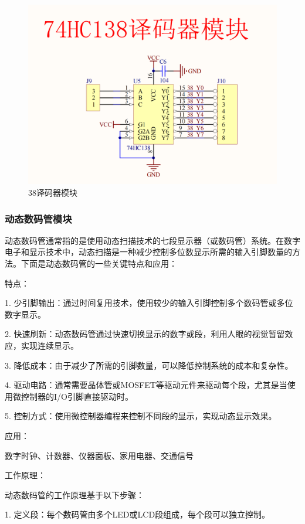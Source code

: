 \documentclass{textreportclass}  %
\begin{document}
	
	\begin{figure}[htbp]
		\centering
		\includegraphics[scale=0.3]{Fig/38译码器模块.png}
		\caption{38译码器模块}\label{Fig.17}
	\end{figure}
	
	\subsubsection{动态数码管模块}					%
	动态数码管通常指的是使用动态扫描技术的七段显示器（或数码管）系统。在数字电子和显示技术中，动态扫描是一种减少控制多位数显示所需的输入引脚数量的方法。下面是动态数码管的一些关键特点和应用：
	
	特点：
	
	1. 少引脚输出：通过时间复用技术，使用较少的输入引脚控制多个数码管或多位数字显示。
	
	2. 快速刷新：动态数码管通过快速切换显示的数字或段，利用人眼的视觉暂留效应，实现连续显示。
	
	3. 降低成本：由于减少了所需的引脚数量，可以降低控制系统的成本和复杂性。
	
	4. 驱动电路：通常需要晶体管或MOSFET等驱动元件来驱动每个段，尤其是当使用微控制器的I/O引脚直接驱动时。
	
	5. 控制方式：使用微控制器编程来控制不同段的显示，实现动态显示效果。
	
	应用：
	
数字时钟、计数器、仪器面板、家用电器、交通信号
	
	工作原理：
	
	动态数码管的工作原理基于以下步骤：
	
	1. 定义段：每个数码管由多个LED或LCD段组成，每个段可以独立控制。
	
\end{document}
